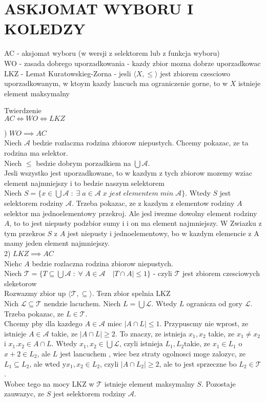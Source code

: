 \documentclass{article}
\begin{document}
\ttfamily
\section*{ASKJOMAT WYBORU I KOLEDZY}
AC  - aksjomat wyboru (w wersji z selektorem lub z funkcja wyboru)\medskip\\
WO  - zasada dobrego uporzadkowania - kazdy zbior mozna dobrze uporzadkowac\medskip\\
LKZ - Lemat Kuratowskieg-Zorna - jesli $\langle X,\leq\rangle$ jest zbiorem czesciowo uporzadkowanym, w ktoym kazdy lancuch ma ograniczenie gorne, to w $X$ istnieje element maksymalny\bigskip\\
\bigskip
\begin{center}\large
    Twierdzenie\smallskip\\
    $AC\iff WO\iff LKZ$
\end{center}\bigskip
{}) $WO\implies AC$\medskip\\
Niech $\mathcal{A}$ bedzie rozlaczna rodzina zbiorow niepustych. Chcemy pokazac, ze ta rodzina ma selektor.\\
Niech $\leq$ bedzie dobrym porzadkiem na $\bigcup \mathcal{A}$.\\
Jesli wszystko jest uporzadkowane, to w kazdym z tych zbiorow mozemy wziac element najmniejszy i to bedzie naszym selektorem\\
Niech $S=\{x\in \bigcup\mathcal{A}\;:\;\exists\;a\in\mathcal{A}\;x\;jest\;elementem\;min\;\mathcal{A}\}$. Wtedy $S$ jest selektorem rodziny $\mathcal{A}$. Trzeba pokazac, ze z kazdym z elementow rodziny $A$ selektor ma jednoelementowy przekroj. Ale jesl iwezme dowolny element rodziny $A$, to to jest niepusty podzbior sumy i i on ma element najmniejszy. W Zwiazku z tym przekros $S$ z $A$ jest niepusty i jednoelementowy, bo w kazdym elemencie z A mamy jeden element najmniejszy.\bigskip\\

2) $LKZ\implies AC$\medskip\\
Niehc $A$ bedzie rozlaczna rodzina zbiorow niepustych.\\
Niech $\mathcal {T}=\{T\subseteq\bigcup\mathcal{A}\;:\;\forall\;A\in\mathcal{A} \quad |T\cap A|\leq 1\}$ - czyli $\mathcal{T}$ jest zbiorem czesciowych sleketorow\\
Rozwazmy zbior up $\langle \mathcal{T},\subseteq\rangle$. Tezn zbior spelnia LKZ\\
Nich $\mathcal{L}\subseteq\mathcal{T}$ nendzie lacuchem. Niech $L=\bigcup\mathcal{L}$. Wtedy $L$ ogranicza od gory $\mathcal{L}$. Trzeba pokazac, ze $L\in\mathcal{T}$.\\
Chcemy pby dla kazdego $A\in\mathcal{A}$ miec $|A\cap L|\leq 1$. Przypuscmy nie wprost, ze istnieje $A\in\mathcal A$ takie, ze $|A\cap L|\geq2$. To znaczy, ze istnieja $x_1, x_2$ takie, ze $x_1\neq x_2$ i $x_1.x_2\in A\cap L$. Wtedy $x_1,x_2\in\bigcup \mathcal L$, czyli istnieja $L_1,L_2$takie, ze $x_1\in L_1$ o $x+2\in L_2$, ale $L$ jest lancuchem , wiec bez straty ogolnosci moge zalozyc, ze $L_1\subseteq L_2$, ale wted y$x_1,x_2\in L_2$, czyli $|A\cap L_2|\geq 2$, ale to jest sprzeczne bo $L_2\in\mathcal{T}$.\bigskip\\
Wobec tego na mocy LKZ w $\mathcal{T}$ istnieje element maksymalny $S$. Pozostaje zauwazyc, ze $S$ jest selektorem rodziny $\mathcal A$.
\end{document}
